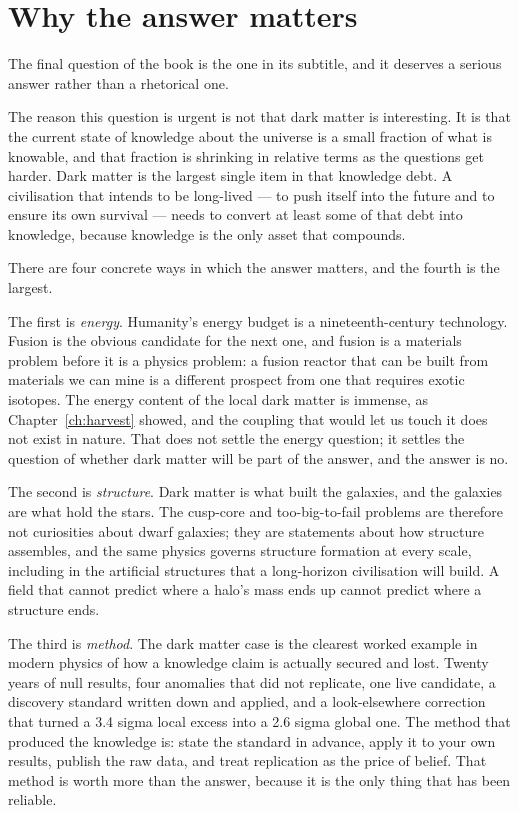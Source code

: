 \section{Why the answer matters}The final question of the book is the one in its
subtitle, and it deserves a serious answer rather than a rhetorical one.

The reason this question is urgent is not that dark matter is interesting.
It is that the current state of knowledge about the universe is a small
fraction of what is knowable, and that fraction is shrinking in relative
terms as the questions get harder. Dark matter is the largest single item in
that knowledge debt. A civilisation that intends to be long-lived --- to
push itself into the future and to ensure its own survival --- needs to
convert at least some of that debt into knowledge, because knowledge is the
only asset that compounds.

There are four concrete ways in which the answer matters, and the fourth is
the largest.

The first is \emph{energy}. Humanity's energy budget is a nineteenth-century
technology. Fusion is the obvious candidate for the next one, and fusion is
a materials problem before it is a physics problem: a fusion reactor that
can be built from materials we can mine is a different prospect from one
that requires exotic isotopes. The energy content of the local dark matter
is immense, as Chapter~\ref{ch:harvest} showed, and the coupling that would
let us touch it does not exist in nature. That does not settle the energy
question; it settles the question of whether dark matter will be part of the
answer, and the answer is no.

The second is \emph{structure}. Dark matter is what built the galaxies, and
the galaxies are what hold the stars. The cusp-core and too-big-to-fail
problems are therefore not curiosities about dwarf galaxies; they are
statements about how structure assembles, and the same physics governs
structure formation at every scale, including in the artificial structures
that a long-horizon civilisation will build. A field that cannot predict
where a halo's mass ends up cannot predict where a structure ends.

The third is \emph{method}. The dark matter case is the clearest worked
example in modern physics of how a knowledge claim is actually secured and
lost. Twenty years of null results, four anomalies that did not replicate,
one live candidate, a discovery standard written down and applied, and a
look-elsewhere correction that turned a 3.4 sigma local excess into a 2.6
sigma global one. The method that produced the knowledge is: state the
standard in advance, apply it to your own results, publish the raw data, and
treat replication as the price of belief. That method is worth more than the
answer, because it is the only thing that has been reliable.

